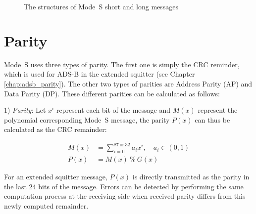 \begin{figure}[!ht]
  \centering
  \caption{The structures of Mode~S short and long messages}
  \label{fig:modes_msg_structures}
\end{figure}




\section{Parity} \label{sec:parity}

Mode~S uses three types of parity. The first one is simply the CRC reminder, which is used for ADS-B in the extended squitter (see Chapter \ref{chap:adsb_parity}). The other two types of parities are Address Parity (AP) and Data Parity (DP). These different parities can be calculated as follows:

1) \emph{Parity}: Let  $x^{i}$ represent each bit of the message and $M(x)$ represent the polynomial corresponding Mode~S message, the parity $P(x)$ can thus be calculated as the CRC remainder:

\begin{equation} \label{eq:crc}
  \begin{split}
    M(x) &= \sum_{i=0}^{87~\mathrm{or}~32} a_i x^i , \quad a_i \in (0, 1)\\
    P(x) &= M(x) ~ \% ~ G(x)
  \end{split}
\end{equation}

For an extended squitter message, $P(x)$ is directly transmitted as the parity in the last 24 bits of the message. Errors can be detected by performing the same computation process at the receiving side when received parity differs from this newly computed remainder.

